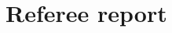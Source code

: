 \documentclass[12pt,a4paper]{amsart}
\numberwithin{equation}{section}
\begin{document}
\section*{Referee report}
\end{document}

